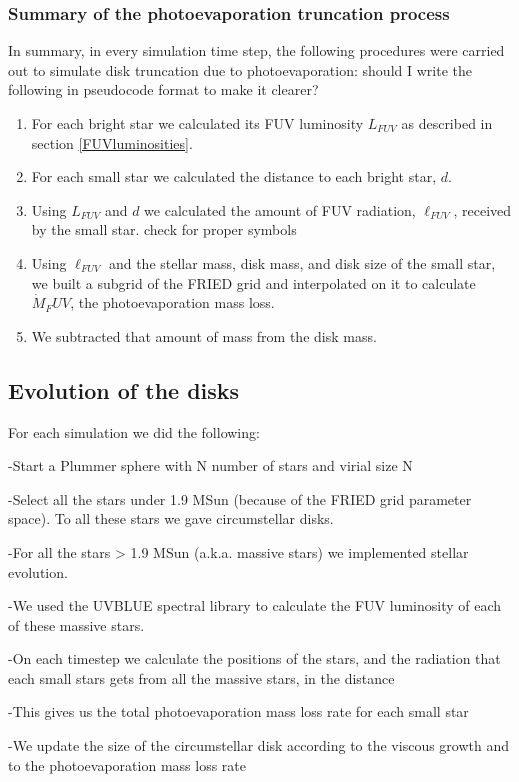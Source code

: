 \documentclass[fleqn,usenatbib]{mnras}
\newcommand\note[1]{{\colorbox{yellow!60}{\color{magenta}#1}}}
\begin{document}
\subsubsection{Summary of the photoevaporation truncation process}
In summary, in every simulation time step, the following procedures were carried out to simulate disk truncation due to photoevaporation:
\note{should I write the following in pseudocode format to make it clearer?}
\begin{enumerate}
\item For each bright star we calculated its FUV luminosity $L_{FUV}$ as described in section \ref{FUVluminosities}.
\item For each small star we calculated the distance to each bright star, $d$.
\item Using $L_{FUV}$ and $d$ we calculated the amount of FUV radiation, $\ell_{FUV}$, received by the small star. \note{check for proper symbols}
\item Using $\ell_{FUV}$ and the stellar mass, disk mass, and disk size of the small star, we built a subgrid of the FRIED grid and interpolated on it to calculate $\dot{M}_FUV$, the photoevaporation mass loss.
\item We subtracted that amount of mass from the disk mass.
\end{enumerate}


\subsection{Evolution of the disks}
For each simulation we did the following:

-Start a Plummer sphere with N number of stars and virial size N

-Select all the stars under 1.9 MSun (because of the FRIED grid parameter space). To all these stars we gave circumstellar disks.

-For all the stars > 1.9 MSun (a.k.a. massive stars) we implemented stellar evolution.

-We used the UVBLUE spectral library to calculate the FUV luminosity of each of these massive stars.

-On each timestep we calculate the positions of the stars, and the radiation that each small stars gets from all the massive stars, in the distance

-This gives us the total photoevaporation mass loss rate for each small star

-We update the size of the circumstellar disk according to the viscous growth and to the photoevaporation mass loss rate
\end{document}
